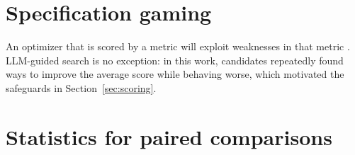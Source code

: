 \section{Specification gaming}
\label{sec:bg-gaming}
An optimizer that is scored by a metric will exploit weaknesses in that
metric \cite{amodei2016,krakovna2020}. LLM-guided search is no exception: in
this work, candidates repeatedly found ways to improve the average score
while behaving worse, which motivated the safeguards in
Section~\ref{sec:scoring}.

\section{Statistics for paired comparisons}
\label{sec:bg-stats}
